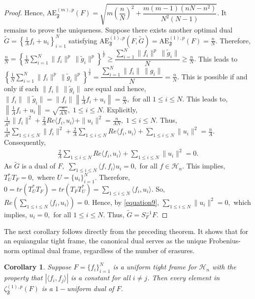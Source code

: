 \documentclass[final,1p,times]{elsarticle}
\newtheorem{cor}[thm]{Corollary}
\begin{document}
\begin{proof}
Hence, $ \mathrm{AE}_{\mathfrak{F}}^{(m),p}(F) = \sqrt{ m\left( \dfrac{n}{N} \right)^2 + \dfrac{m(m-1)(nN - n^2)}{N^2(N-1)} }.$  It remains to prove the uniqueness. Suppose there exists another optimal dual \( \tilde{G} = \left\{ \frac{1}{A} f_i + u_i \right\}_{i=1}^N \) satisfying \(  \mathrm{AE}_{\mathfrak{F}}^{(1),p}(F, \tilde{G}) = \mathrm{AE}_{\mathfrak{F}}^{(1),p}(F) = \frac{n}{N} \). Therefore, $\frac{n}{N}=\left\{\frac{1}{N} \sum \limits_{i=1}^N\|f_i\|^p\,\| \tilde{g}_i \| ^p\right\}^{\frac{1}{p}} \geq \dfrac{\sum \limits_{i=1}^N\|f_i\|^p\,\| \tilde{g}_i \|}{N} \geq \frac{n}{N}. $ This leads to $\left\{\frac{1}{N} \sum \limits_{i=1}^N\|f_i\|^p\,\| \tilde{g}_i \| ^p\right\}^{\frac{1}{p}} = \dfrac{\sum \limits_{i=1}^N\|f_i\|\,\| g_i \|}{N} = \frac{n}{N}.$ This is possible if and only if  each $\|f_i\|\,\| \tilde{g}_i \|$ are equal and hence, $\|f_i\|\,\| \tilde{g}_i \| = \|f_i\|\left\| \frac{1}{A}f_i + u_i \right\|= \frac{n}{N},$ for all $1 \leq i \leq N.$ This leads to, $\left\| \frac{1}{A}f_i + u_i \right\| = \sqrt{\frac{n}{AN}},\;1 \leq i \leq N.$ Explicitly, $\frac{1}{A^2}\|f_i\|^2 + \frac{2}{A} Re\langle f_i, u_i \rangle + \|u_i\|^2 = \frac{n}{AN},\;1 \leq i \leq N.$ Thus, $\frac{1}{A^2}\sum\limits_{1 \leq i \leq N} \|f_i\|^2 + \frac{2}{A} \sum\limits_{1 \leq i \leq N} Re\langle f_i, u_i \rangle + \sum\limits_{1 \leq i \leq N} \|u_i\|^2  = \frac{n}{A}.$ Consequently,
 \begin{align}\label{equation9}
 	\frac{2}{A} \sum\limits_{1 \leq i \leq N} Re\langle f_i, u_i \rangle + \sum\limits_{1 \leq i \leq N} \|u_i\|^2 = 0.
 \end{align}
As $\tilde{G}$ is a dual of $F,$  $\sum\limits_{1\leq i \leq N} \langle f,f_i \rangle u_i =0,$ for all $f \in \mathcal{H}_n.$ This implies, $T_{U}^* T_F = 0,$ where $U= \{u_i\}_{i=1}^N.$ Therefore, $0 = tr(T_{U}^* T_F) = tr(T_F T_{U}^*) = \sum\limits_{1\leq i \leq N} \langle f_i,u_i \rangle. $ So, $Re\left( \sum\limits_{1\leq i \leq N} \langle f_i,u_i \rangle \right) =0.$ Hence, by \eqref{equation9}, $\sum\limits_{1\leq i \leq N} \|u_i\|^2 = 0,$ which implies, $u_i = 0,$ for all $1 \leq i \leq N.$ Thus, $\tilde{G} = S_{F}^{-1}F $.


\end{proof}


The next corollary follows directly from the preceding theorem. It shows that for an equiangular tight frame, the canonical dual serves as the unique Frobenius-norm optimal dual frame, regardless of the number of erasures.


\begin{cor}
Suppose $F = \{f_i\}_{i=1}^N$ is a uniform tight frame for $\mathcal{H}_n$ with the property that $|\langle f_i, f_j \rangle|$ is a constant for all \( i \neq j \). Then every element in $ \zeta_{\mathfrak{F}}^{(1),p}(F)$ is a $1-$uniform dual of $F$.
\end{cor}
\end{document}
